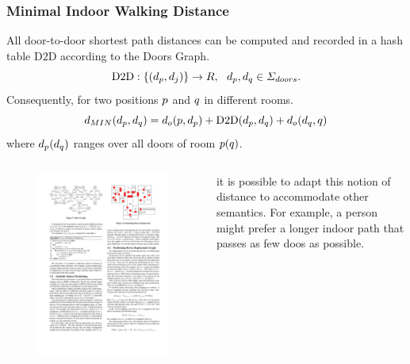 \begin{frame}
\frametitle{Minimal Indoor Walking Distance}

All door-to-door shortest path distances can be computed and recorded in a hash table $\mathrm{D2D}$ according to the Doors Graph.
\pause
\begin{equation}
  \mathrm{D2D}: \mathnormal{ \{ (d_p, d_j) \} \rightarrow R, ~~d_p, d_q \in \Sigma_{doors} }.
\end{equation}
\pause
Consequently, for two positions $\mathnormal{p}$ and $\mathnormal{q}$ in different rooms.
\pause
\begin{equation}
  \mathnormal{d_{MIN}(d_p, d_q) = d_o(p, d_p) + \mathrm{D2D}(d_p, d_q) + d_o(d_q, q)}
\end{equation}
where $\mathnormal{d_p(d_q)}$ ranges over all doors of room $\mathnormal{p(q)}$.

\begin{columns}[c]

    \begin{figure}[tb]
      \includegraphics[width=\columnwidth]{figures/2-3/2-3-3.pdf}
    \end{figure}

    \scriptsize{
    it is possible to adapt this notion of distance to accommodate other semantics. For example, a person might prefer a longer indoor path that passes as few doos as possible.
    }
    
\end{columns}

\end{frame}
